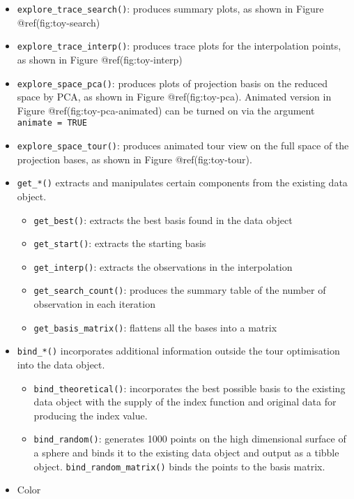\begin{itemize}
\item
  \texttt{explore\_trace\_search()}: produces summary plots, as shown in Figure @ref(fig:toy-search)
\item
  \texttt{explore\_trace\_interp()}: produces trace plots for the interpolation points, as shown in Figure @ref(fig:toy-interp)
\item
  \texttt{explore\_space\_pca()}: produces plots of projection basis on the reduced space by PCA, as shown in Figure @ref(fig:toy-pca). Animated version in Figure @ref(fig:toy-pca-animated) can be turned on via the argument \texttt{animate\ =\ TRUE}
\item
  \texttt{explore\_space\_tour()}: produces animated tour view on the full space of the projection bases, as shown in Figure @ref(fig:toy-tour).
\item
  \texttt{get\_*()} extracts and manipulates certain components from the existing data object.

  \begin{itemize}
  \tightlist
  \item
    \texttt{get\_best()}: extracts the best basis found in the data object
  \item
    \texttt{get\_start()}: extracts the starting basis
  \item
    \texttt{get\_interp()}: extracts the observations in the interpolation
  \item
    \texttt{get\_search\_count()}: produces the summary table of the number of observation in each iteration
  \item
    \texttt{get\_basis\_matrix()}: flattens all the bases into a matrix
  \end{itemize}
\item
  \texttt{bind\_*()} incorporates additional information outside the tour optimisation into the data object.

  \begin{itemize}
  \tightlist
  \item
    \texttt{bind\_theoretical()}: incorporates the best possible basis to the existing data object with the supply of the index function and original data for producing the index value.
  \item
    \texttt{bind\_random()}: generates 1000 points on the high dimensional surface of a sphere and binds it to the existing data object and output as a tibble object. \texttt{bind\_random\_matrix()} binds the points to the basis matrix.
  \end{itemize}
\item
  Color


\end{itemize}
